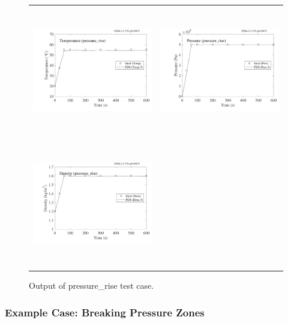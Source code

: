 \documentclass[11pt]{book}
\begin{document}
\begin{figure}[ht]
\begin{tabular*}{\textwidth}{lr}
\includegraphics[height=2.2in]{SCRIPT_FIGURES/pressure_rise_T} &
\includegraphics[height=2.2in]{SCRIPT_FIGURES/pressure_rise_P} \\
\includegraphics[height=2.2in]{SCRIPT_FIGURES/pressure_rise_R} &
\end{tabular*}
\caption[Results of the {\ct pressure\_rise} test case]{Output of {\ct pressure\_rise} test case.}
\label{pressure_rise}
\end{figure}


\subsubsection{Example Case: Breaking Pressure Zones}
\label{zone_break_example}
\end{document}
